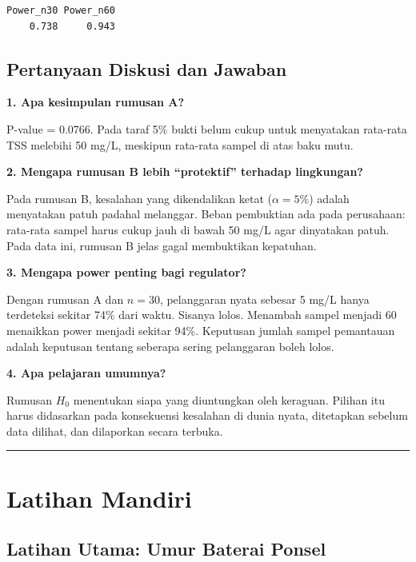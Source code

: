 \documentclass[
  indonesian,
  letterpaper,
]{book}
\begin{document}
\begin{verbatim}
Power_n30 Power_n60 
    0.738     0.943 
\end{verbatim}

\section{Pertanyaan Diskusi dan
Jawaban}\label{pertanyaan-diskusi-dan-jawaban-1}

\textbf{1. Apa kesimpulan rumusan A?}

P-value = 0.0766. Pada taraf 5\% bukti belum cukup untuk menyatakan
rata-rata TSS melebihi 50 mg/L, meskipun rata-rata sampel di atas baku
mutu.

\textbf{2. Mengapa rumusan B lebih ``protektif'' terhadap lingkungan?}

Pada rumusan B, kesalahan yang dikendalikan ketat (\(\alpha = 5\%\))
adalah menyatakan patuh padahal melanggar. Beban pembuktian ada pada
perusahaan: rata-rata sampel harus cukup jauh di bawah 50 mg/L agar
dinyatakan patuh. Pada data ini, rumusan B jelas gagal membuktikan
kepatuhan.

\textbf{3. Mengapa power penting bagi regulator?}

Dengan rumusan A dan \(n = 30\), pelanggaran nyata sebesar 5 mg/L hanya
terdeteksi sekitar 74\% dari waktu. Sisanya lolos. Menambah sampel
menjadi 60 menaikkan power menjadi sekitar 94\%. Keputusan jumlah sampel
pemantauan adalah keputusan tentang seberapa sering pelanggaran boleh
lolos.

\textbf{4. Apa pelajaran umumnya?}

Rumusan \(H_0\) menentukan siapa yang diuntungkan oleh keraguan. Pilihan
itu harus didasarkan pada konsekuensi kesalahan di dunia nyata,
ditetapkan sebelum data dilihat, dan dilaporkan secara terbuka.

\begin{center}\rule{0.5\linewidth}{0.5pt}\end{center}


\chapter{Latihan Mandiri}\label{latihan-mandiri-1}

\section{Latihan Utama: Umur Baterai
Ponsel}\label{latihan-utama-umur-baterai-ponsel}
\end{document}
